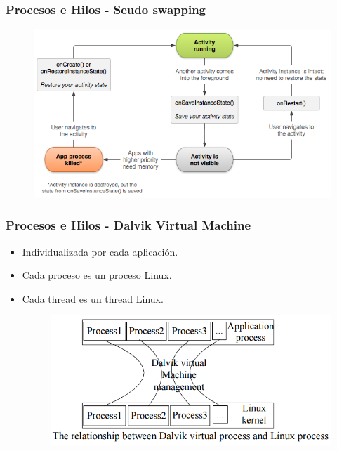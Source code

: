 \begin{frame}
  \frametitle{Procesos e Hilos - Seudo swapping}
  \begin{figure}
      \centering
      \includegraphics[scale=0.5]{images/restore-instance.png}
  \end{figure}
\end{frame}

\begin{frame}
  \frametitle{Procesos e Hilos - Dalvik Virtual Machine}
  \begin{itemize}
      \item Individualizada por cada aplicación.
      
      \item Cada proceso es un proceso Linux.
      
      \item Cada thread es un thread Linux.
      
      \begin{figure}
	\centering
	\includegraphics[scale=0.3]{images/dvm-linux-processes.png}
      \end{figure}
  \end{itemize}
\end{frame}

